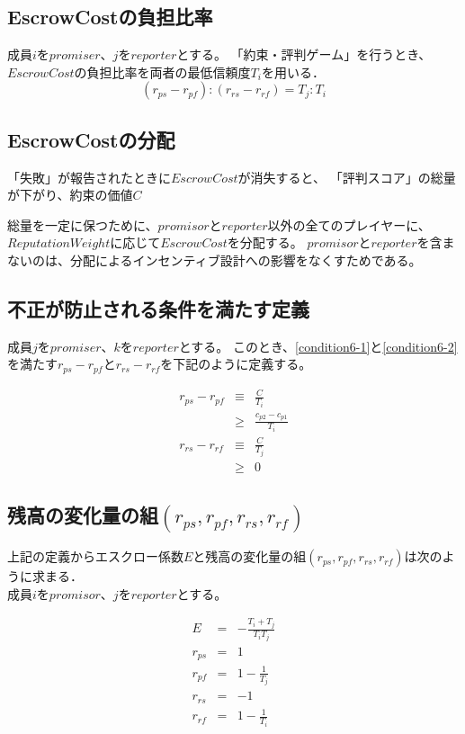 \subsection{EscrowCostの負担比率}
成員$i$を$promiser$、$j$を$reporter$とする。
「約束・評判ゲーム」を行うとき、$EscrowCost$の負担比率を両者の最低信頼度$T_i$を用いる．\\

\begin{equation}
  (r_{ps} - r_{pf}):(r_{rs} - r_{rf}) = T_j:T_i
\end{equation}

\subsection{EscrowCostの分配}
「失敗」が報告されたときに$EscrowCost$が消失すると、
「評判スコア」の総量が下がり、約束の価値$C$

総量を一定に保つために、$promisor$と$reporter$以外の全てのプレイヤーに、
$ReputationWeight$に応じて$EscrowCost$を分配する。
$promisor$と$reporter$を含まないのは、分配によるインセンティブ設計への影響をなくすためである。

\subsection{不正が防止される条件を満たす定義}
成員$j$を$promiser$、$k$を$reporter$とする。
このとき、\eqref{condition6-1}と\eqref{condition6-2}を満たす$r_{ps} - r_{pf}$と$r_{rs} - r_{rf}$を下記のように定義する。

\begin{eqnarray}
  r_{ps} - r_{pf} &\equiv& \frac{C}{T_i} \label{condition6-3} \\
                  &\geq& \frac{c_{p2} - c_{p1}}{T_i} \nonumber \\
  r_{rs} - r_{rf} &\equiv& \frac{C}{T_j} \label{condition6-4} \\
                  &\geq& 0 \nonumber
\end{eqnarray}

\subsection{残高の変化量の組$ (r_{ps}, r_{pf}, r_{rs}, r_{rf}) $}
上記の定義からエスクロー係数$E$と残高の変化量の組$ (r_{ps}, r_{pf}, r_{rs}, r_{rf}) $は次のように求まる． \\
成員$i$を$promisor$、$j$を$reporter$とする。

\begin{eqnarray}
  E &=& - \frac{T_i + T_j}{T_i T_j} \\
  r_{ps} &=& 1 \\
  r_{pf} &=& 1 - \frac{1}{T_j} \\
  r_{rs} &=& -1 \\
  r_{rf} &=& 1 - \frac{1}{T_i}
\end{eqnarray}
